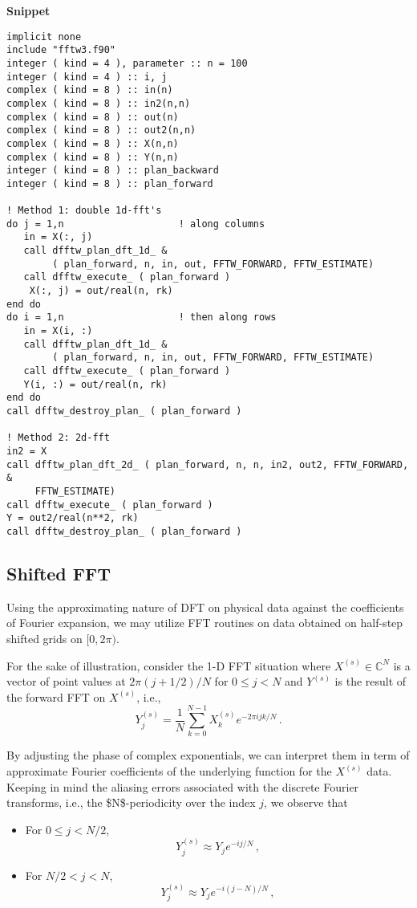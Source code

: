 \documentclass[11pt]{article}
\begin{document}
\textbf{Snippet}
\begin{verbatim}
implicit none
include "fftw3.f90"
integer ( kind = 4 ), parameter :: n = 100
integer ( kind = 4 ) :: i, j
complex ( kind = 8 ) :: in(n)
complex ( kind = 8 ) :: in2(n,n)
complex ( kind = 8 ) :: out(n)
complex ( kind = 8 ) :: out2(n,n)
complex ( kind = 8 ) :: X(n,n)
complex ( kind = 8 ) :: Y(n,n)
integer ( kind = 8 ) :: plan_backward
integer ( kind = 8 ) :: plan_forward

! Method 1: double 1d-fft's
do j = 1,n                    ! along columns
   in = X(:, j)
   call dfftw_plan_dft_1d_ &
        ( plan_forward, n, in, out, FFTW_FORWARD, FFTW_ESTIMATE)
   call dfftw_execute_ ( plan_forward )
    X(:, j) = out/real(n, rk)
end do
do i = 1,n                    ! then along rows
   in = X(i, :)
   call dfftw_plan_dft_1d_ &
        ( plan_forward, n, in, out, FFTW_FORWARD, FFTW_ESTIMATE)
   call dfftw_execute_ ( plan_forward )
   Y(i, :) = out/real(n, rk)
end do
call dfftw_destroy_plan_ ( plan_forward )

! Method 2: 2d-fft
in2 = X
call dfftw_plan_dft_2d_ ( plan_forward, n, n, in2, out2, FFTW_FORWARD, &
     FFTW_ESTIMATE)
call dfftw_execute_ ( plan_forward )
Y = out2/real(n**2, rk)
call dfftw_destroy_plan_ ( plan_forward )
\end{verbatim}

\subsection{Shifted FFT}
\label{sec:org9971c98}
Using the approximating nature of DFT on physical data against the coefficients of Fourier expansion, we may utilize FFT routines on data obtained on half-step shifted grids on \([0, 2\pi)\).

For the sake of illustration, consider the 1-D FFT situation where \(X^{(s)} \in \mathbb{C}^{N}\) is a vector of point values at \(2\pi(j+1/2)/N\) for \(0 \le j < N\) and \(Y^{(s)}\) is the result of the forward FFT on \(X^{(s)}\), i.e.,
\[
Y^{(s)}_j = \frac{1}{N} \sum_{k=0}^{N-1} X^{(s)}_k e^{-2 \pi i j k /N} \,.
\]

By adjusting the phase of complex exponentials, we can interpret them in term of approximate Fourier coefficients of the underlying function for the \(X^{(s)}\) data. Keeping in mind the aliasing errors associated with the discrete Fourier transforms, i.e., the \$N\$-periodicity over the index \(j\), we observe that

\begin{itemize}
\item For \(0 \le j < N/2\),
\[
   Y^{(s)}_j \approx Y_j e^{- i j/N} \,,
   \]
\item For \(N/2 < j < N\),
\[
   Y^{(s)}_j \approx Y_j e^{- i (j-N)/N} \,,
   \]
\end{itemize}
\end{document}
